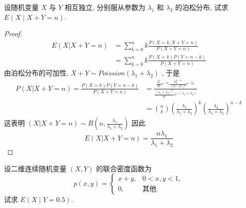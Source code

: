\documentclass[../main.tex]{subfiles}
\begin{document}
\begin{exercise}{}{}
设随机变量 $X$ 与 $Y$ 相互独立, 分别服从参数为 $\lambda_1$ 和 $\lambda_2$ 的泊松分布, 试求 $E(X \mid X+Y=n)$.
\end{exercise}

\begin{proof}
  \[
 \begin{aligned}
  E\left( X|X+ Y= n \right)& = \sum _{k= 0}^{n}k\frac{P\left( X= k, X+ Y= n \right)  }{ P\left( X+ Y= n \right) }\\ 
   &= \sum _{k= 0}^{n}k\frac{P\left( X= k \right)P\left( Y= n-k \right)   }{P\left( X+ Y= n \right)  }  
 \end{aligned}  
  \] 由泊松分布的可加性, \(  X+ Y\sim Poission\left(  \lambda _1 +  \lambda _2  \right)   \) , 于是\[
\begin{aligned}
  P\left( X|X+ Y= n \right)= \frac{P\left( X= k \right)P\left( Y= n-k \right)   }{P\left( X+ Y= n \right)  }&=   \frac{\frac{ \lambda _1 ^{k} }{k! }e^{- \lambda _1 }\frac{ \lambda _2 ^{n-k} }{\left( n-k \right)!  }e^{- \lambda _2 }   }{\frac{\left(  \lambda _1 +  \lambda _2  \right)^{n}  }{n! }e^{-\left(  \lambda _1 +  \lambda _2  \right) }  }  \\ 
   &= \binom{ n }{k  } \left( \frac{ \lambda _1  }{ \lambda _1 +  \lambda _2  }  \right)^{k}\left( \frac{ \lambda _2  }{ \lambda _1 +  \lambda _2  }  \right)^{n-k}   
\end{aligned}
  \]这表明 \( \left(  X|X+ Y= n \right) \sim  B\left( n, \frac{ \lambda _1  }{ \lambda _1 +  \lambda _2  }  \right)  \) 因此 \[
  E\left( X|X+ Y= n \right)= \frac{n \lambda _1  }{ \lambda _1 +  \lambda _2  }  
  \]
\end{proof}

\begin{exercise}{}{}
设二维连续随机变量 $(X,Y)$ 的联合密度函数为
\[
p(x,y) = \begin{cases} x+y, & 0 < x, y < 1, \\ 0, & \text{其他}. \end{cases}
\]
试求 $E(X \mid Y=0.5)$.
\end{exercise}
\end{document}
